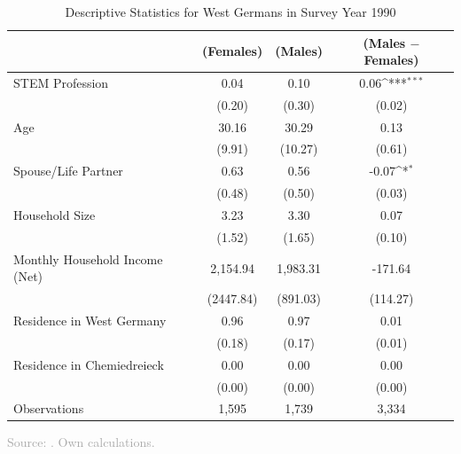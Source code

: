 \documentclass[11pt, aspectratio=1610, xcolor={dvipsnames}]{beamer}
\def\sym#1{\ifmmode^{#1}\else\(^{#1}\)\fi}
\begin{document}
	\begin{frame}
		\frametitle{}
		{\linespread{1}\tiny
			\begin{table}[h]
				\centering
				\caption{Descriptive Statistics for West Germans in Survey Year 1990}
				\label{tab:descriptiveswest}
				\begin{tabular}{l*{3}{c}}
					\toprule
					& (Females) & (Males) & (Males $-$ Females) \\
					\midrule
					STEM Profession     &        0.04&       0.10&         0.06\sym{***}\\
					&       (0.20)&       (0.30)&           (0.02)\\
					\addlinespace
					Age                 &       30.16&           30.29&          0.13         \\
					&        (9.91)&         (10.27)&             (0.61)\\
					\addlinespace
					Spouse/Life Partner &        0.63&            0.56&         -0.07\sym{*}  \\
					&         (0.48)&         (0.50)&        (0.03)\\
					\addlinespace
					Household Size      &        3.23&           3.30&         0.07        \\
					&       (1.52)&        (1.65)       &      (0.10)\\
					\addlinespace
					Monthly Household Income (Net)&     2,154.94&      1,983.31&       -171.64     \\
					&     (2447.84)&      (891.03)&    (114.27)\\
					\addlinespace
					Residence in West Germany&        0.96&         0.97&            0.01      \\
					&       (0.18)&        (0.17)&         (0.01)\\
					\addlinespace
					Residence in Chemiedreieck&        0.00&            0.00&            0.00       \\
					&           (0.00)&          (0.00)&         (0.00)\\
					\midrule
					Observations        &        1,595&             1,739&            3,334               \\
					\bottomrule
				\end{tabular}
			\end{table}
		}
		
		{\scriptsize
			\textcolor{darkgray}{Source: \cite{SOEP2023}. Own calculations.}
		}
		
	\end{frame}
	
\end{document}

